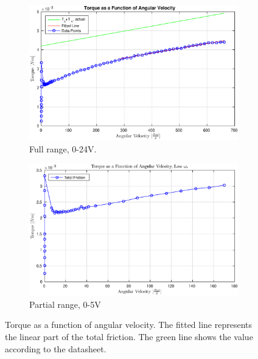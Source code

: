 \begin{figure}[!h]
	\begin{subfigure}[t]{.49\linewidth}
		\centering
		\includegraphics[width=\textwidth]{graphics/tevel}
		\caption{Full range, 0-24V.}
		\label{fig:tqanglefull}
	\end{subfigure}
	\begin{subfigure}[t]{.49\linewidth}
		\includegraphics[width=\textwidth]{graphics/tevel_low}
		\caption{Partial range, 0-5V}
		\label{fig:tqanglelow}
	\end{subfigure}
	\caption[Torque as a function of angular velocity]{Torque as a function of angular velocity. The fitted line represents the linear part of the total friction. The green line shows the value according to the datasheet.}
	\label{fig:tqangle}
\end{figure}

